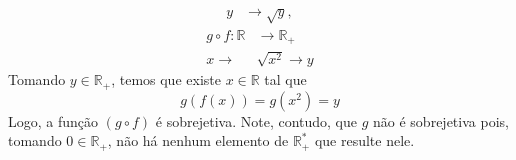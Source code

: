 \begin{enumerate}
\begin{align*}
        y &\rightarrow \sqrt{y},
    \end{align*}
    \begin{align*}
        g \circ f: \mathbb{R} &\rightarrow \mathbb{R}_+ \\
        x \rightarrow &\sqrt{x^2} \rightarrow y
    \end{align*}
    Tomando $y \in \mathbb{R}_+$, temos que existe $x \in \mathbb{R}$ tal que 
    \begin{displaymath}
        g(f(x)) = g(x^2) = y 
    \end{displaymath}
    Logo, a função $(g \circ f)$ é sobrejetiva. Note, contudo, que $g$ não é sobrejetiva pois, tomando $0 \in \mathbb{R}_+$, não há nenhum elemento de $\mathbb{R}^*_+$ que resulte nele.
\end{enumerate}
